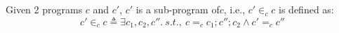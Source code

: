 %
Given 2 programs $c$ and $c'$, $c'$ is a sub-program of$c$, i.e., $c' \in_{c} c$ is defined as:
\begin{equation}
c' \in_{c} c \triangleq \exists c_1, c_2, c''. ~ s.t.,~
c =_{c} c_1; c''; c_2 \land c' =_{c} c''
\end{equation} 
%
%
%
%

%
%
%
%
%
%
%
% 
%
\clearpage